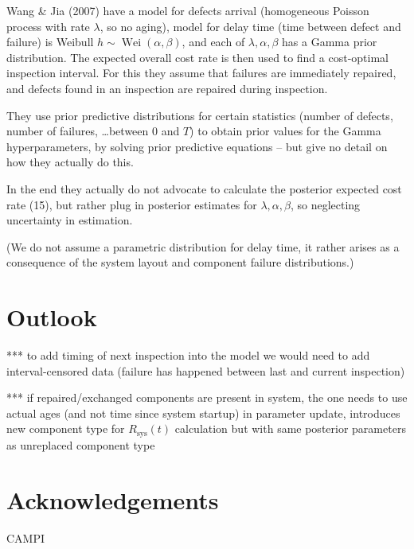 \documentclass[authoryear]{elsarticle}
\newcommand{\Rsys}{R_\text{sys}}
\def\Rsys{R_\text{sys}}
\newcommand{\wei}{\operatorname{Wei}} %
\begin{document}
Wang \& Jia (2007) have a model for defects arrival (homogeneous Poisson process with rate $\lambda$, so no aging),
model for delay time (time between defect and failure) is Weibull $h \sim \wei(\alpha,\beta)$,
and each of $\lambda, \alpha, \beta$ has a Gamma prior distribution.
The expected overall cost rate is then used to find a cost-optimal inspection interval.
For this they assume that failures are immediately repaired,
and defects found in an inspection are repaired during inspection.

They use prior predictive distributions for certain statistics (number of defects, number of failures, \ldots between $0$ and $T$)
to obtain prior values for the Gamma hyperparameters,
by solving prior predictive equations -- but give no detail on how they actually do this.

In the end they actually do not advocate to calculate the posterior expected cost rate (15),
but rather plug in posterior estimates for $\lambda, \alpha, \beta$,
so neglecting uncertainty in estimation.

(We do not assume a parametric distribution for delay time,
it rather arises as a consequence of the system layout and component failure distributions.)



\section{Outlook}

*** to add timing of next inspection into the model we would need to add interval-censored data
(failure has happened between last and current inspection)

*** if repaired/exchanged components are present in system,
the one needs to use actual ages (and not time since system startup) in parameter update,
introduces new component type for $\Rsys(t)$ calculation but with same posterior parameters as unreplaced component type


\section*{Acknowledgements}

CAMPI



\end{document}
